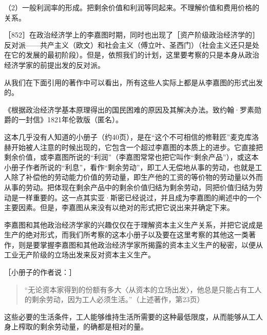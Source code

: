 （2）一般利润率的形成。把剩余价值和利润等同起来。不理解价值和费用价格的关系。


［852］在政治经济学上的李嘉图时期，同时也出现了［资产阶级政治经济学的］反对派——共产主义（欧文）和社会主义（傅立叶、圣西门）（社会主义还只是处在它的发展的最初阶段）。但是，依照我们的计划，这里要考察的只是本身从政治经济学家的前提出发的反对派。

从我们在下面引用的著作中可以看出，所有这些人实际上都是从李嘉图的形式出发的。



《根据政治经济学基本原理得出的国民困难的原因及其解决办法。致约翰·罗素勋爵的一封信》1821年伦敦版（匿名）。

这本几乎没有人知道的小册子（约40页），是在“这个不可相信的修鞋匠”麦克库洛赫开始被人注意的时候出现的，它包含一个超过李嘉图的本质上的进步。它直接把剩余价值，或李嘉图所说的“利润”（李嘉图常常也把它叫作“剩余产品”），或这本小册子作者所说的“利息”，看作“剩余劳动”，即工人无偿地从事的劳动，也就是工人除了补偿他的劳动能力价值的劳动量，即生产他的工资的等价物的劳动量以外而从事的劳动。把体现在剩余产品中的剩余价值归结为剩余劳动，同把价值归结为劳动是一样重要的。这一点其实亚·斯密已经说过，并且成为李嘉图的阐述中的一个主要因素。但是，李嘉图从来没有以绝对的形式把它说出来并确定下来。

李嘉图和其他政治经济学家的兴趣仅仅在于理解资本主义生产关系，并把它说成是生产的绝对形式，而我们所考察的这本小册子以及要在这里考察的其他这一类著作，则是要掌握李嘉图和其他政治经济学家所揭露的资本主义生产的秘密，以便从工业无产阶级的立场出发来反对资本主义生产。

［小册子的作者说：］

\begin{quote}{“无论资本家得到的份额有多大〈从资本的立场出发〉，他总是只能占有工人的剩余劳动，因为工人必须生活。”（上述著作，第23页）}\end{quote}

这些必要的生活条件，工人能够维持生活所需要的这种最低限度，从而能够从工人身上榨取的剩余劳动量，的确都是相对的量。

